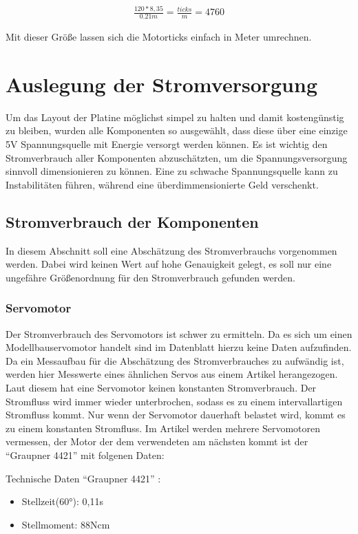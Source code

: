 \begin{align}
\frac{120*8,35}{0.21m}=\frac{ticks}{m}=4760
\end{align}

Mit dieser Größe lassen sich die Motorticks einfach in Meter umrechnen. 

\section{Auslegung der Stromversorgung}

Um das Layout der Platine möglichst simpel zu halten und damit kostengünstig zu bleiben, wurden alle Komponenten so ausgewählt, dass diese über eine einzige 5V Spannungsquelle mit Energie versorgt werden können.
Es ist wichtig den Stromverbrauch aller Komponenten abzuschätzten, um die Spannungsversorgung sinnvoll dimensionieren zu können. Eine zu schwache Spannungsquelle kann zu Instabilitäten führen,
während eine überdimmensionierte Geld verschenkt.

\subsection{Stromverbrauch der Komponenten}
In diesem Abschnitt soll eine Abschätzung des Stromverbrauchs vorgenommen werden. Dabei wird keinen Wert auf hohe Genauigkeit gelegt, es soll nur eine ungefähre Größenordnung für den Stromverbrauch gefunden werden.

\subsubsection{Servomotor}
Der Stromverbrauch des Servomotors ist schwer zu ermitteln. Da es sich um einen Modellbauservomotor handelt 
sind im Datenblatt hierzu keine Daten aufzufinden. Da ein Messaufbau für die Abschätzung des Stromverbrauches
zu aufwändig ist, werden hier Messwerte eines ähnlichen Servos aus einem Artikel \cite{website-servo} herangezogen.
Laut diesem hat eine Servomotor keinen konstanten Stromverbrauch. Der Stromfluss wird immer wieder unterbrochen, sodass es zu einem intervallartigen Stromfluss kommt.
Nur wenn der Servomotor dauerhaft belastet wird, kommt es zu einem konstanten Stromfluss.
Im Artikel werden mehrere Servomotoren vermessen, der Motor der dem verwendeten am nächsten kommt ist der ``Graupner 4421'' mit folgenen Daten:


Technische Daten ``Graupner 4421'' \cite{website-servo-vergleich-dat}:
\begin{itemize}
 \item Stellzeit(60°): 0,11s
 \item Stellmoment: 88Ncm 
\end{itemize}


